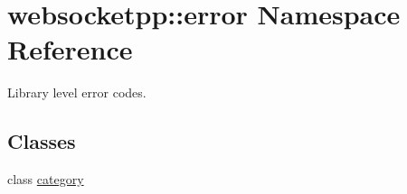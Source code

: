 \hypertarget{namespacewebsocketpp_1_1error}{}\section{websocketpp\+:\+:error Namespace Reference}
\label{namespacewebsocketpp_1_1error}


Library level error codes.  


\subsection*{Classes}
\begin{DoxyCompactItemize}
\item 
class \mbox{\hyperlink{classwebsocketpp_1_1error_1_1category}{category}}
\end{DoxyCompactItemize}
